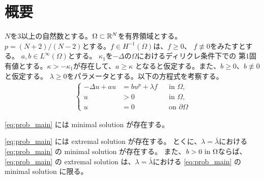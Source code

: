 \section{概要}

$N$を$3$以上の自然数とする。$\Omega \subset \mathbb{R}^N$を有界領域とする。
$p = (N+2)/(N-2)$とする。$f \in H^{-1}(\Omega)$は、$f \geq 0$、
$f \not \equiv 0$をみたすとする。
$a, b \in L^\infty(\Omega)$とする。
$\kappa_1$を$-\Delta$の$\Omega$におけるディリクレ条件下での
第$1$固有値とする。$\kappa > - \kappa_1$が存在して、$a \geq \kappa$
となると仮定する。また、$b \geq 0$、$b \not \equiv 0$と仮定する。
$\lambda \geq 0$をパラメータとする。以下の方程式を考察する。
\begin{align}
 \left\{
 \begin{aligned}
  -\Delta u + a u &= b u^p + \lambda f  & &\text{in~} \Omega,  \\
  u &> 0 & &\text{in~} \Omega, \\
  u &= 0 & &\text{on~} \partial\Omega
 \end{aligned}
 \right. \tag*{$(\spadesuit)_\lambda$} \label{eq:prob_main}
\end{align}

\begin{thm} \label{thm:minimal_solution}
 \ref{eq:prob_main} には minimal solution が存在する。
\end{thm}

\begin{thm} \label{thm:extremal_solution}
 \ref{eq:prob_main} には extremal solution が存在する。
 とくに、$\lambda = \bar{\lambda}$における
 \ref{eq:prob_main} の
 minimal solution が存在する。
 また、$b > 0 ~\text{in}~ \Omega$ならば、\ref{eq:prob_main} の 
 extremal solution は、$\lambda = \bar{\lambda}$における
 \ref{eq:prob_main} の
 minimal solution に限る。
\end{thm}

